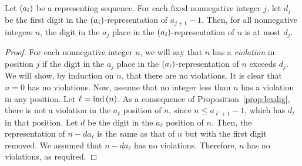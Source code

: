 \documentclass[english,12pt]{article}
\newcommand{\seq}{\p}
\DeclareMathOperator{\ind}{ind}
\begin{document}
\begin{prop}\label{prop:maxdig}
Let $\seq{a_i}$ be a representing sequence.  For each fixed nonnegative integer $j$, let $d_j$ be the first digit in the $\seq{a_i}$-representation of $a_{j+1}-1$.  Then, for all nonnegative integers $n$, the digit in the $a_j$ place in the $\seq{a_i}$-representation of $n$ is at most $d_j$.
\end{prop}
\begin{proof}
For each nonnegative integer $n$, we will say that $n$ has a \emph{violation} in position $j$ if the digit in the $a_j$ place in the $\seq{a_i}$-representation of $n$ exceeds $d_j$.  We will show, by induction on $n$, that there are no violations.  It is clear that $n=0$ has no violations.  Now, assume that no integer less than $n$ has a violation in any position.  Let $\ell=\ind\p{n}$.  As a consequence of Proposition~\ref{prop:lexdig}, there is not a violation in the $a_\ell$ position of $n$, since $n\leq a_{\ell+1}-1$, which has $d_\ell$ in that position.  Let $d$ be the digit in the $a_\ell$ position of $n$.  Then, the representation of $n-da_\ell$ is the same as that of $n$ but with the first digit removed.  We assumed that $n-da_\ell$ has no violations.  Therefore, $n$ has no violations, as required.
\end{proof}
\end{document}
